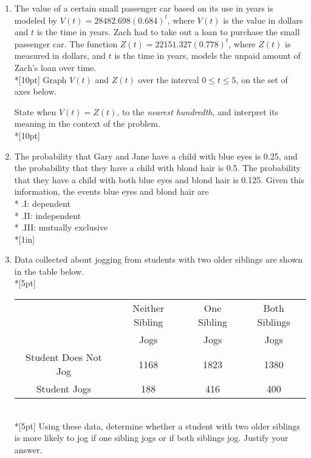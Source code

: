 \documentclass[12pt, oneside]{article}
\begin{document}
\begin{enumerate}
\newpage

\item The value of a certain small passenger car based on its use in years is modeled by $V(t) =28482.698(0.684)^t$, where $V(t)$ is the value in dollars and $t$ is the time in years. Zach had to take out a loan to purchase the small passenger car. The function $Z(t)=22151.327(0.778)^t$, where $Z(t)$ is measured in dollars, and $t$ is the time in years, models the unpaid amount of Zach’s loan over time.\\*[10pt]
Graph $V(t)$ and $Z(t)$ over the interval $0 \leq t \leq 5$, on the set of axes below.
\begin{center}
\end{center}
State when $V(t)=Z(t)$, to the \emph{nearest hundredth}, and interpret its meaning in the context of the problem.\\*[10pt]

\newpage

\item The probability that Gary and Jane have a child with blue eyes is 0.25, and the probability that they have a child with blond hair is 0.5. The probability that they have a child with both blue eyes and blond hair is 0.125. Given this information, the events blue eyes and blond hair are\\*
.\qquad I: dependent\\*
.\qquad II: independent\\*
.\qquad III: mutually exclusive\\*[1in] %

\item Data collected about jogging from students with two older siblings are shown in the table below.\\*[5pt]
\begin{tabular}{|c|c|c|c|}
\hline 
& Neither Sibling & One Sibling & Both Siblings\\ 
& Jogs & Jogs & Jogs\\\hline 
Student Does Not Jog & 1168 & 1823 & 1380 \\ 
\hline 
Student Jogs & 188 & 416 & 400 \\ 
\hline 
\end{tabular}\\*[5pt]
Using these data, determine whether a student with two older siblings is more likely to jog if one sibling jogs or if both siblings jog. Justify your answer. %


\end{enumerate}
\end{document}
